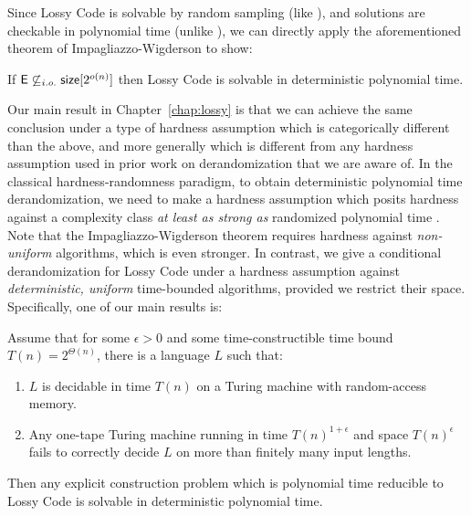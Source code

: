 Since {\sc Lossy Code} is solvable by random sampling (like \avoid), and solutions are checkable in polynomial time (unlike \avoid), we can directly apply the aforementioned theorem of Impagliazzo-Wigderson to show:
\begin{corollary*}
If $\cl{E} \not\subseteq_{i.o.} \cl{size}[2^{o(n)}]$ then {\sc Lossy Code} is solvable in deterministic polynomial time.
\end{corollary*}
Our main result in Chapter~\ref{chap:lossy} is that we can achieve the same conclusion under a type of hardness assumption which is categorically different than the above, and more generally which is different from any hardness assumption used in prior work on derandomization that we are aware of. In the classical hardness-randomness paradigm, to obtain deterministic polynomial time derandomization, we need to make a hardness assumption which posits hardness against a complexity class \emph{at least as strong as } randomized polynomial time \cite{IW97,IW98,CT21b}. Note that the Impagliazzo-Wigderson theorem requires hardness against \emph{non-uniform} algorithms, which is even stronger. In contrast, we give a conditional derandomization for {\sc Lossy Code} under a hardness assumption against \emph{deterministic, uniform} time-bounded algorithms, provided we restrict their space. Specifically, one of our main results is:
\begin{theorem*}
Assume that for some $\epsilon > 0$ and some time-constructible time bound $T(n) = 2^{\Theta(n)}$, there is a language $L$ such that:
\begin{enumerate}
    \item $L$ is decidable in time $T(n)$ on a Turing machine with random-access memory.
    \item Any one-tape Turing machine running in time $T(n)^{1+\epsilon}$ and space $T(n)^\epsilon$ fails to correctly decide $L$ on more than finitely many input lengths.
\end{enumerate}
Then any explicit construction problem which is polynomial time reducible to {\sc Lossy Code} is solvable in deterministic polynomial time.
\end{theorem*}

